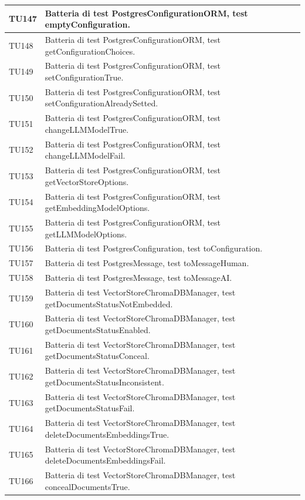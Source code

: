 \documentclass[10pt, a4paper]{article}
\begin{document}
\begin{xltabular}{\textwidth}{p{0.12\textwidth}|X}
\hline
TU147 & Batteria di test PostgresConfigurationORM, test emptyConfiguration. \\
\hline
TU148 & Batteria di test PostgresConfigurationORM, test getConfigurationChoices. \\
\hline
TU149 & Batteria di test PostgresConfigurationORM, test setConfigurationTrue. \\
\hline
TU150 & Batteria di test PostgresConfigurationORM, test setConfigurationAlreadySetted. \\
\hline
TU151 & Batteria di test PostgresConfigurationORM, test changeLLMModelTrue. \\
\hline
TU152 & Batteria di test PostgresConfigurationORM, test changeLLMModelFail. \\
\hline
TU153 & Batteria di test PostgresConfigurationORM, test getVectorStoreOptions. \\
\hline
TU154 & Batteria di test PostgresConfigurationORM, test getEmbeddingModelOptions. \\
\hline
TU155 & Batteria di test PostgresConfigurationORM, test getLLMModelOptions. \\
\hline
TU156 & Batteria di test PostgresConfiguration, test toConfiguration. \\
\hline
TU157 & Batteria di test PostgresMessage, test toMessageHuman. \\
\hline
TU158 & Batteria di test PostgresMessage, test toMessageAI. \\
\hline
TU159 & Batteria di test VectorStoreChromaDBManager, test getDocumentsStatusNotEmbedded. \\
\hline
TU160 & Batteria di test VectorStoreChromaDBManager, test getDocumentsStatusEnabled. \\
\hline
TU161 & Batteria di test VectorStoreChromaDBManager, test getDocumentsStatusConceal. \\
\hline
TU162 & Batteria di test VectorStoreChromaDBManager, test getDocumentsStatusInconsistent. \\
\hline
TU163 & Batteria di test VectorStoreChromaDBManager, test getDocumentsStatusFail. \\
\hline
TU164 & Batteria di test VectorStoreChromaDBManager, test deleteDocumentsEmbeddingsTrue. \\
\hline
TU165 & Batteria di test VectorStoreChromaDBManager, test deleteDocumentsEmbeddingsFail. \\
\hline
TU166 & Batteria di test VectorStoreChromaDBManager, test concealDocumentsTrue. \\
\hline

\end{xltabular}
\end{document}
